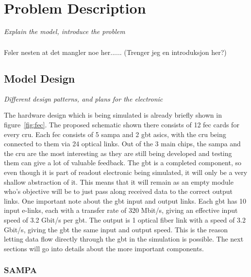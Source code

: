 \documentclass[a4paper]{report}
\begin{document}
\chapter{Problem Description}
\textit{Explain the model, introduce the problem}

\paragraph{}
Føler nesten at det mangler noe her...... (Trenger jeg en introduksjon her?)

\section{Model Design}
\textit{Different design patterns, and plans for the electronic}
{\color{red}
The hardware design which is being simulated is already briefly shown in figure~\ref{fig:fec}.
The proposed schematic shown there consists of 12 \gls{fec} cards for every \gls{cru}.
Each \gls{fec} consists of 5 \gls{sampa} and 2 \gls{gbt} \glspl{asic}, with the \gls{cru} being connected to them via 24 optical links.
Out of the 3 main chips, the \gls{sampa} and the \gls{cru} are the most interesting as they are still being developed and testing them can give a lot of valuable feedback.
The \gls{gbt} is a completed component, so even though it is part of readout electronic being simulated, it will only be a very shallow abstraction of it.
This means that it will remain as an empty module who's objective will be to just pass along received data to the correct output links.
One important note about the \gls{gbt} input and output links.
Each \gls{gbt} has 10 input e-links, each with a transfer rate of 320 Mbit/s, giving an effective input speed of 3.2 Gbit/s per \gls{gbt}.
The output is 1 optical fiber link with a speed of 3.2 Gbit/s, giving the \gls{gbt} the same input and output speed.
This is the reason letting data flow directly through the \gls{gbt} in the simulation is possible.
The next sections will go into details about the more important components.

\subsection{SAMPA}
\label{subsec:sampa}
}
\end{document}
